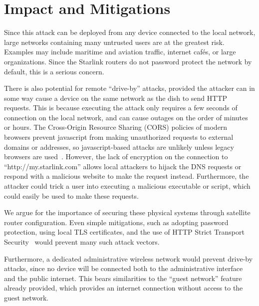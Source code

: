 \section{Impact and Mitigations}\label{sec:impact}

Since this attack can be deployed from any device connected to the local network, large networks containing many untrusted users are at the greatest risk.
Examples may include maritime and aviation traffic, internet cafés, or large organizations.
Since the Starlink routers do not password protect the network by default, this is a serious concern.

There is also potential for remote ``drive-by'' attacks, provided the attacker can in some way cause a device on the same network as the dish to send HTTP requests.
This is because executing the attack only requires a few seconds of connection on the local network, and can cause outages on the order of minutes or hours.
The Cross-Origin Resource Sharing (CORS) policies of modern browsers prevent javascript from making unauthorized requests to external domains or addresses, so javascript-based attacks are unlikely unless legacy browsers are used~\cite{cors}.
However, the lack of encryption on the connection to ``http://my.starlink.com'' allows local attackers to hijack the DNS requests or respond with a malicious website to make the request instead.
Furthermore, the attacker could trick a user into executing a malicious executable or script, which could easily be used to make these requests.

We argue for the importance of securing these physical systems through satellite router configuration.
Even simple mitigations, such as adopting password protection, using local TLS certificates, and the use of HTTP Strict Transport Security~\cite{rfc6797} would prevent many such attack vectors.


Furthermore, a dedicated administrative wireless network would prevent drive-by attacks, since no device will be connected both to the administrative interface and the public internet.
This bears similarities to the ``guest network'' feature already provided, which provides an internet connection without access to the guest network.
